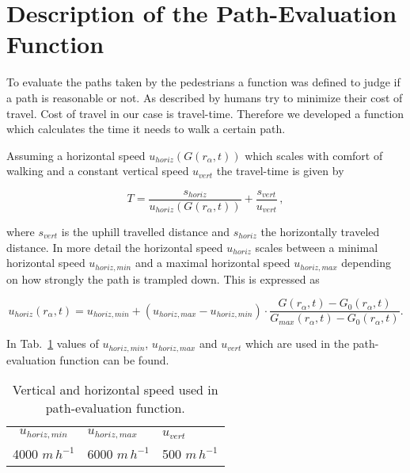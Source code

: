 \section{Description of the Path-Evaluation Function}

To evaluate the paths taken by the pedestrians a function was defined to judge if a path is reasonable or not. As described by \citet{koelbl_helbing:2003} humans try to minimize their cost of travel. Cost of travel in our case is travel-time. Therefore we developed a function which calculates the time it needs to walk a certain path.

Assuming a horizontal speed $u_{horiz}(G(r_{\alpha},t))$ which scales with comfort of walking and a constant vertical speed $u_{vert}$ the travel-time is given by

\begin{equation}
T= \frac{s_{horiz}}{u_{horiz}(G(r_{\alpha},t))} + \frac{s_{vert}}{u_{vert}} \,,
\end{equation}

where $s_{vert}$ is the uphill travelled distance and $s_{horiz}$ the horizontally traveled distance. In more detail the horizontal speed $u_{horiz}$ scales between a minimal horizontal speed $u_{horiz,min}$ and a maximal horizontal speed $u_{horiz,max}$ depending on how strongly the path is trampled down. This is expressed as

\begin{equation}
u_{horiz}(r_{\alpha},t) = u_{horiz,min} + (u_{horiz,max}-u_{horiz,min}) \cdot \frac{G(r_{\alpha},t)-G_{0}(r_{\alpha},t)}{G_{max}(r_{\alpha},t)-G_{0}(r_{\alpha},t)}.
\end{equation}

In Tab.\ \ref{table_speed} values of $u_{horiz,min}$, $u_{horiz,max}$ and $u_{vert}$ which are used in the path-evaluation function can be found.

\begin{table}[h]
\begin{center}
 \setlength{\abovecaptionskip}{0pt}
 \setlength{\belowcaptionskip}{10pt}
\caption{Vertical and horizontal speed used in path-evaluation function.}
\begin{tabular}{c l l}
  \hline
  $u_{horiz,min}$ & $u_{horiz,max}$ & $u_{vert}$ \\
  4000 $m\,h^{-1}$ & 6000 $m\,h^{-1}$ & 500 $m\,h^{-1}$ \\ \hline
\end{tabular}
\label{table_speed}
\end{center}
\end{table}